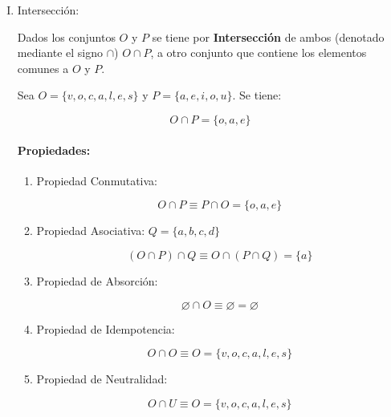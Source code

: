 \begin{enumerate}[I.]
{
}
\item Intersección:{
 Dados los conjuntos $O$ y $P$ se tiene por \textbf{Intersección} de ambos 
(denotado
mediante el signo $\cap$) $O \cap P$, a otro conjunto que contiene los elementos
comunes a $O$ y $P$.

\ejem Sea $O = \{v,o,c,a,l,e,s\}$ y $ P = \{a,e,i,o,u\}$. Se tiene:

\begin{equation}
O \cap P = \{o,a,e\}
\end{equation}

\paragraph*{Propiedades:}

\begin{enumerate}[i]
\item Propiedad Conmutativa:

\begin{equation}
O \cap P \equiv P \cap O = \{o,a,e\}
\end{equation}
 
\item Propiedad Asociativa: $Q = \{a,b,c,d\}$

\begin{equation}
(O \cap P) \cap Q \equiv O \cap (P \cap Q) = \{a\}
\end{equation}

\item Propiedad de Absorción:

\begin{equation}
\varnothing \cap O \equiv \varnothing = \varnothing
\end{equation}

\item Propiedad de Idempotencia:

\begin{equation}
O \cap O \equiv O = \{v,o,c,a,l,e,s\}
\end{equation}

\item Propiedad de Neutralidad:

\begin{equation}
O \cap U \equiv O = \{v,o,c,a,l,e,s\}
\end{equation}

\end{enumerate}



}
\end{enumerate}
